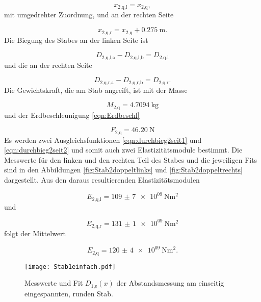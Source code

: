 \begin{equation}
  x_\text{2,q,l} = x_\text{2,q},
\end{equation}
mit umgedrehter Zuordnung, und an der rechten Seite

\begin{equation}
  x_\text{2,q,r} = x_\text{2,q} + \SI{0.275}{\meter}.
\end{equation}
Die Biegung des Stabes an der linken Seite ist

\begin{equation}
  D_\text{2,q,l,a} - D_\text{2,q,l,b} = D_\text{2,q,l}
\end{equation}
und die an der rechten Seite

\begin{equation}
  D_\text{2,q,r,a} - D_\text{2,q,r,b} = D_\text{2,q,r}.
\end{equation}
Die Gewichtskraft, die am Stab angreift, ist mit der Masse

\begin{equation}
  M_\text{2,q} = \SI{4.7094}{\kilo\gram}
\end{equation}
und der Erdbeschleunigung \eqref{eqn:Erdbeschl}

\begin{equation}
  F_\text{2,q} = \SI{46.20}{\newton}
\end{equation}
Es werden zwei Ausgleichsfunktionen \eqref{eqn:durchbieg2seit1} und
\eqref{eqn:durchbieg2seit2} und somit
auch zwei Elastizitätsmodule bestimmt.
Die Messwerte für den linken und den rechten Teil des Stabes und die jeweiligen
Fits sind in den Abbildungen \ref{fig:Stab2doppeltlinks} und
\ref{fig:Stab2doppeltrechts} dargestellt.
Aus den daraus resultierenden Elastizitätsmodulen

\begin{equation}
  E_\text{2,q,l} = \SI{109(7)e09}{\newton\meter\squared}
\end{equation}
und

\begin{equation}
  E_\text{2,q,r} = \SI{131(1)e09}{\newton\meter\squared}
\end{equation}
folgt der Mittelwert

\begin{equation}
  E_\text{2,q} = \SI{120(4)e09}{\newton\meter\squared}.
\end{equation}

\begin{figure}
  \centering
  \texttt{[image: Stab1einfach.pdf]}
  \caption{Messwerte und Fit $D_\text{1,e}(x)$ der Abstandsmessung am einseitig
  eingespannten, runden Stab.}
  \label{fig:Stab1einfach}
\end{figure}

